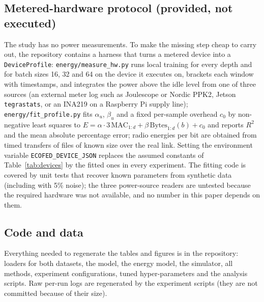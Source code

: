 \subsection{Metered-hardware protocol (provided, not executed)}\label{app:hardware}
The study has no power measurements. To make the missing step cheap to carry out, the repository contains a harness that turns a metered device into a \texttt{DeviceProfile}: \texttt{energy/measure\_hw.py} runs local training for every depth and for batch sizes 16, 32 and 64 on the device it executes on, brackets each window with timestamps, and integrates the power above the idle level from one of three sources (an external meter log such as Joulescope or Nordic PPK2, Jetson \texttt{tegrastats}, or an INA219 on a Raspberry Pi supply line); \texttt{energy/fit\_profile.py} fits $\alpha_u$, $\beta_u$ and a fixed per-sample overhead $c_0$ by non-negative least squares to $E=\alpha\cdot3\,\mathrm{MAC}_{1:d}+\beta\,\mathrm{Bytes}_{1:d}(b)+c_0$ and reports $R^2$ and the mean absolute percentage error; radio energies per bit are obtained from timed transfers of files of known size over the real link. Setting the environment variable \texttt{ECOFED\_DEVICE\_JSON} replaces the assumed constants of Table~\ref{tab:devices} by the fitted ones in every experiment. The fitting code is covered by unit tests that recover known parameters from synthetic data (including with 5\% noise); the three power-source readers are untested because the required hardware was not available, and no number in this paper depends on them.

\subsection{Code and data}
Everything needed to regenerate the tables and figures is in the repository: loaders for both datasets, the model, the energy model, the simulator, all methods, experiment configurations, tuned hyper-parameters and the analysis scripts. Raw per-run logs are regenerated by the experiment scripts (they are not committed because of their size).
